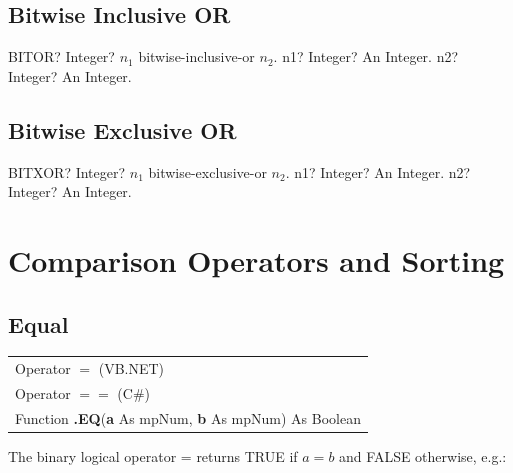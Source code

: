 \subsection{Bitwise Inclusive OR}


\vspace{0.6cm}
\begin{mpFunctionsExtract}
	\mpWorksheetFunctionTwoNotImplemented
	{BITOR? Integer? $n_1$ bitwise-inclusive-or $n_2$.}
	{n1? Integer? An Integer.}
	{n2? Integer? An Integer.}
\end{mpFunctionsExtract}




\subsection{Bitwise Exclusive OR}


\vspace{0.6cm}
\begin{mpFunctionsExtract}
	\mpWorksheetFunctionTwoNotImplemented
	{BITXOR? Integer? $n_1$ bitwise-exclusive-or $n_2$.}
	{n1? Integer? An Integer.}
	{n2? Integer? An Integer.}
\end{mpFunctionsExtract}



\newpage
\section{Comparison Operators and Sorting}
\label{FpComparisonOperators}




\subsection{Equal}
\begin{tabular}{p{481pt}}
	\toprule
	\textsf{Operator $\boldsymbol{=}$} (VB.NET)\index{Multiprecision Functions!=} \\
	\textsf{Operator $\boldsymbol{==}$} (C\#)\index{Multiprecision Functions!=} \\
	\midrule
	\textsf{Function \textbf{.EQ}(\textbf{a} As mpNum, \textbf{b} As mpNum) As Boolean}\index{Multiprecision Functions!.EQ} \\
	\bottomrule
\end{tabular}

\vspace{0.3cm}
The binary logical operator \textsf{=} returns TRUE if  $a = b$ and FALSE otherwise, e.g.: 

